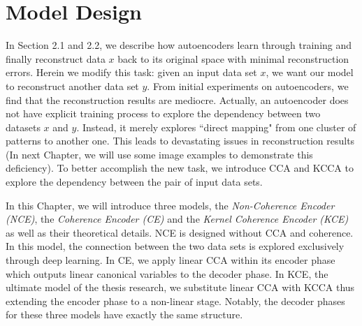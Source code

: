 \documentclass[12pt]{report} %
\begin{document}
\chapter{Model Design}
In Section 2.1 and 2.2, we describe how autoencoders learn through training and finally reconstruct data $x$ back to its original space with minimal reconstruction errors. Herein we modify this task: given an input data set $x$, we want our model to reconstruct another data set $y$. From initial experiments on autoencoders, we find that the reconstruction results are mediocre. Actually, an autoencoder does not have explicit training process to explore the dependency between two datasets $x$ and $y$. Instead, it merely explores ``direct mapping" from one cluster of patterns to another one. This leads to devastating issues in reconstruction results (In next Chapter, we will use some image examples to demonstrate this deficiency). To better accomplish the new task, we introduce CCA and KCCA to explore the dependency between the pair of input data sets. 

In this Chapter, we will introduce three models, the \textit{Non-Coherence Encoder (NCE)}, the \textit{Coherence Encoder (CE)} and the \textit{Kernel Coherence Encoder (KCE)} as well as their theoretical details. NCE is designed without CCA and coherence. In this model, the connection between the two data sets is explored exclusively through deep learning. In CE, we apply linear CCA within its encoder phase which outputs linear canonical variables to the decoder phase. In KCE, the ultimate model of the thesis research, we substitute linear CCA with KCCA thus extending the encoder phase to a non-linear stage. Notably, the decoder phases for these three models have exactly the same structure. 
\end{document}
